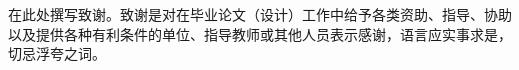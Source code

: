 \begin{myacknowledgement}

    在此处撰写致谢。致谢是对在毕业论文（设计）工作中给予各类资助、指导、协助以及提供各种有利条件的单位、指导教师或其他人员表示感谢，语言应实事求是，切忌浮夸之词。

\end{myacknowledgement}
